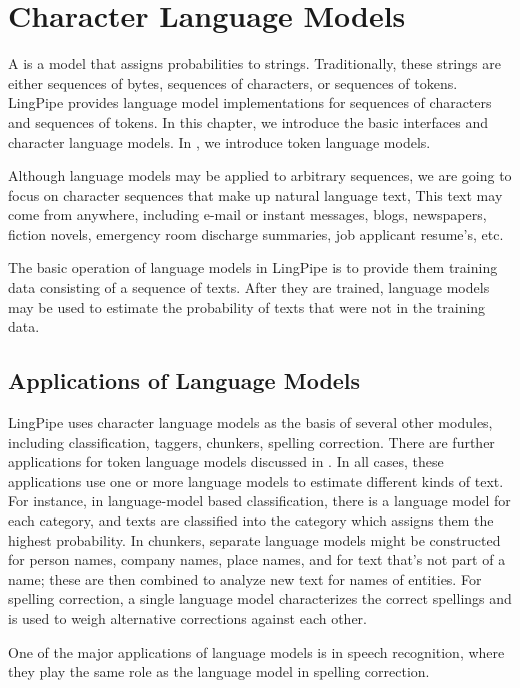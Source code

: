 \chapter{Character Language Models}\label{chap:char-lm}

A  is a model that assigns probabilities to
strings.  Traditionally, these strings are either sequences of bytes,
sequences of characters, or sequences of tokens.  LingPipe provides
language model implementations for sequences of characters and
sequences of tokens.  In this chapter, we introduce the basic
interfaces and character language models.  In ,
we introduce token language models.

Although language models may be applied to arbitrary sequences, we are
going to focus on character sequences that make up natural language
text, This text may come from anywhere, including e-mail or instant
messages, blogs, newspapers, fiction novels, emergency room discharge
summaries, job applicant resume's, etc.

The basic operation of language models in LingPipe is to provide them
training data consisting of a sequence of texts.  After they are
trained, language models may be used to estimate the probability of
texts that were not in the training data.  

\section{Applications of Language Models}\label{section:char-lm-apps}

LingPipe uses character language models as the basis of several other
modules, including classification, taggers, chunkers, spelling
correction.  There are further applications for token language models
discussed in .  In all cases, these applications use
one or more language models to estimate different kinds of text.  For
instance, in language-model based classification, there is a language
model for each category, and texts are classified into the category
which assigns them the highest probability.  In chunkers, separate
language models might be constructed for person names, company names,
place names, and for text that's not part of a name; these are then
combined to analyze new text for names of entities.  For spelling
correction, a single language model characterizes the correct
spellings and is used to weigh alternative corrections against each
other.


One of the major applications of language models is in speech
recognition, where they play the same role as the language model in
spelling correction.  

